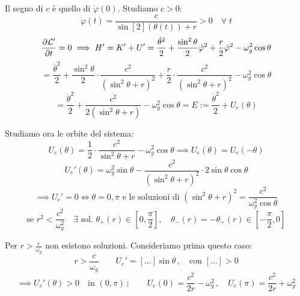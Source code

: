 \begin{example}
    Il segno di $c $ è quello di $\dot{\varphi}(0)$. Studiamo $c>0$:
    \begin{equation}
        \dot{\varphi}(t)=\frac{c}{\sin[2](\theta(t))+r}>0 \quad \forall\;t
    \end{equation}
    \begin{equation*}
        \pdv{\mathcal{L}'}{t} = 0 \implies H' = K' + U' = \frac{\dot{\theta}^2}{2} + \frac{\sin^2\theta}{2} \dot{\varphi}^2 + \frac{r}{2} \dot{\varphi}^2 - \omega_g^2 \cos\theta
    \end{equation*}
    \begin{equation*}
        = \frac{\dot{\theta}^2}{2} + \frac{\sin^2\theta}{2} \cdot \frac{c^2}{(\sin^2\theta + r)^2} + \frac{r}{2} \cdot \frac{c^2}{(\sin^2\theta + r)^2} - \omega_g^2 \cos\theta
    \end{equation*}
    \begin{equation}
        = \frac{\dot{\theta}^2}{2} + \frac{c^2}{2(\sin^2\theta + r)} - \omega_g^2 \cos\theta = E := \frac{\dot{\theta}^2}{2} + U_e(\theta)
    \end{equation}

    Studiamo ora le orbite del sistema:
    \begin{equation}
        U_e(\theta) = \frac{1}{2} \cdot \frac{c^2}{\sin^2\theta + r} - \omega_g^2 \cos\theta \implies 
        U_e(\theta) = U_e(-\theta)
    \end{equation}
    \begin{equation}
        U_e'(\theta) = \omega_g^2 \sin\theta - \frac{c^2}{(\sin^2\theta + r)^2} \cdot 2\sin\theta \cos\theta
    \end{equation}
    \begin{equation}
        \implies U_e' = 0 \iff \theta = 0, \pi \text{ e le soluzioni di }
        (\sin^2\theta + r)^2 = \frac{c^2}{\omega_g^2 \cos\theta}
    \end{equation}
    \begin{equation}
        \text{se } r^2 < \frac{c^2}{\omega_g^2} \quad \exists \text{ sol. } \theta_+(r) \in \left[ 0, \frac{\pi}{2} \right], \quad \theta_-(r) = -\theta_+(r) \in \left[ -\frac{\pi}{2}, 0 \right]
    \end{equation}

    Per $r> \frac{c}{\omega_g}$ non esistono soluzioni. Consideriamo prima questo caso:
    \begin{equation}
        r > \frac{c}{\omega_g} \qquad 
        U_e' = \left[ \dots \right] \sin\theta \,, \quad \text{con } \left[ \dots \right] > 0 
    \end{equation}
    \begin{equation}
        \implies U_e'(\theta) > 0 \quad \text{in } (0,\pi) \,;\qquad 
        U_e(0) = \frac{c^2}{2r} - \omega_g^2 \,, \quad 
        U_e(\pi) = \frac{c^2}{2r} + \omega_g^2
    \end{equation}


\end{example}
